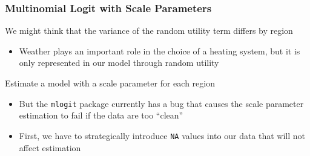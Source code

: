 \documentclass{beamer}\usepackage[]{graphicx}\usepackage[]{color}
\makeatletter
\newcommand{\hlnum}[1]{\textcolor[rgb]{0.686,0.059,0.569}{#1}}%
\newcommand{\hlstr}[1]{\textcolor[rgb]{0.192,0.494,0.8}{#1}}%
\newcommand{\hlcom}[1]{\textcolor[rgb]{0.678,0.584,0.686}{\textit{#1}}}%
\newcommand{\hlopt}[1]{\textcolor[rgb]{0,0,0}{#1}}%
\newcommand{\hlstd}[1]{\textcolor[rgb]{0.345,0.345,0.345}{#1}}%
\newcommand{\hlkwb}[1]{\textcolor[rgb]{0.69,0.353,0.396}{#1}}%
\newcommand{\hlkwc}[1]{\textcolor[rgb]{0.333,0.667,0.333}{#1}}%
\newcommand{\hlkwd}[1]{\textcolor[rgb]{0.737,0.353,0.396}{\textbf{#1}}}%
\newenvironment{kframe}{%
 \def\at@end@of@kframe{}%
 \ifinner\ifhmode%
  \def\at@end@of@kframe{\end{minipage}}%
  \begin{minipage}{\columnwidth}%
 \fi\fi%
 \def\FrameCommand##1{\hskip\@totalleftmargin \hskip-\fboxsep
 \colorbox{shadecolor}{##1}\hskip-\fboxsep
     \hskip-\linewidth \hskip-\@totalleftmargin \hskip\columnwidth}%
 \MakeFramed {\advance\hsize-\width
   \@totalleftmargin\z@ \linewidth\hsize
   \@setminipage}}%
 {\par\unskip\endMakeFramed%
 \at@end@of@kframe}
\newenvironment{knitrout}{}{} %
\makeatother
\begin{document}
\begin{frame}\frametitle{Multinomial Logit with Scale Parameters}
    We might think that the variance of the random utility term differs by region
    \begin{itemize}
    	\item Weather plays an important role in the choice of a heating system, but it is only represented in our model through random utility
    \end{itemize}
    \vspace{2ex}
    Estimate a model with a scale parameter for each region
    \begin{itemize}
    	\item But the \texttt{mlogit} package currently has a bug that causes the scale parameter estimation to fail if the data are too ``clean''
    	\item First, we have to strategically introduce \texttt{NA} values into our data that will not affect estimation
    \end{itemize}
\end{frame}

\end{document}

